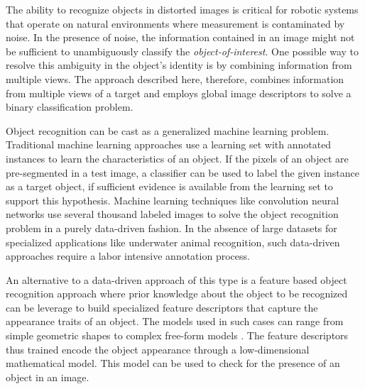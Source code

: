 \documentclass {udthesis}
\begin{document}
The ability to recognize objects in distorted images is critical for robotic systems that operate on natural environments where measurement is contaminated by noise. In the presence of noise, the information contained in an image might not be sufficient to unambiguously classify the \emph{object-of-interest}. 
One possible way to resolve this ambiguity in the object's identity is by combining information from multiple views. The approach described here, therefore, combines information from multiple views of a target and employs global image descriptors to solve a binary classification problem.

Object recognition can be cast as a generalized machine learning problem.
Traditional machine learning approaches \cite{alpaydin} use a learning set with annotated instances to learn the characteristics of an object. If the pixels of an object are pre-segmented in a test image, a classifier can be used to label the given instance as a target object, if sufficient evidence is available from the learning set to support this hypothesis. Machine learning techniques like convolution neural networks \cite{cnn} use several thousand labeled images to solve the object recognition problem in a purely data-driven fashion. In the absence of large datasets for specialized applications like underwater animal recognition, such data-driven approaches require a labor intensive annotation process.

An alternative to a data-driven approach of this type is a feature based object recognition approach \cite{roth} where prior knowledge about the object to be recognized can be leverage to build specialized feature descriptors that capture the appearance traits of an object. The models used in such cases can range from simple geometric shapes to complex free-form models \cite{campbell, belongie}. The feature descriptors thus trained encode the object appearance through a low-dimensional mathematical model. This model can be used to check for the presence of an object in an image.
\end{document}
